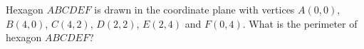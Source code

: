 Hexagon $ABCDEF$ is drawn in the coordinate plane with vertices $A(0,0)$, $B(4,0)$, $C(4,2)$, $D(2,2)$, $E(2,4)$ and $F(0,4)$. What is the perimeter of hexagon $ABCDEF$?
